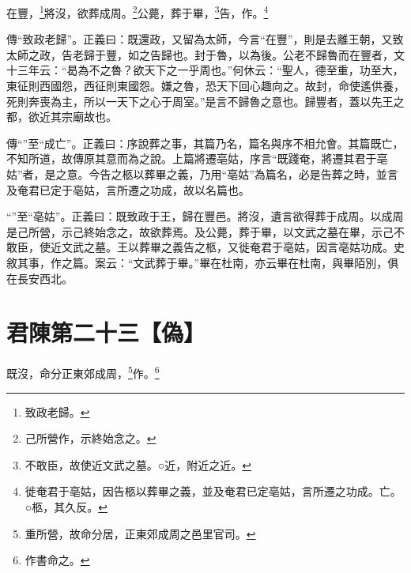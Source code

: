 在豐，\footnote{致政老歸。}將沒，欲葬成周。\footnote{己所營作，示終始念之。}公薨，葬于畢，\footnote{不敢臣，故使近文武之墓。○近，附近之近。}告，作。\footnote{徙奄君于亳姑，因告柩以葬畢之義，並及奄君已定亳姑，言所遷之功成。亡。○柩，其久反。}


{\noindent\zhuan{}\fzbyks 傳“致政老歸”。正義曰：既還政，又留為太師，今言“在豐”，則是去離王朝，又致太師之政，告老歸于豐，如之告歸也。封于魯，以為後。公老不歸魯而在豐者，文十三年云：“曷為不之魯？欲天下之一乎周也。”何休云：“聖人，德至重，功至大，東征則西國怨，西征則東國怨。嫌之魯，恐天下回心趣向之。故封，命使遙供養，死則奔喪為主，所以一天下之心于周室。”是言不歸魯之意也。歸豐者，蓋以先王之都，欲近其宗廟故也。 \par}

{\noindent\zhuan{}\fzbyks 傳“”至“成亡”。正義曰：序說葬之事，其篇乃名，篇名與序不相允會。其篇既亡，不知所道，故傳原其意而為之說。上篇將遷亳姑，序言“既踐奄，將遷其君于亳姑”者，是之意。今告之柩以葬畢之義，乃用“亳姑”為篇名，必是告葬之時，並言及奄君已定于亳姑，言所遷之功成，故以名篇也。 \par}

{\noindent\shu{}\fzkt “”至“亳姑”。正義曰：既致政于王，歸在豐邑。將沒，遺言欲得葬于成周。以成周是己所營，示己終始念之，故欲葬焉。及公薨，葬于畢，以文武之墓在畢，示己不敢臣，使近文武之墓。王以葬畢之義告之柩，又徙奄君于亳姑，因言亳姑功成。史敘其事，作之篇。案云：“文武葬于畢。”畢在杜南，亦云畢在杜南，與畢陌別，俱在長安西北。 \par}

\section{君陳第二十三【偽】}


既沒，命分正東郊成周，\footnote{重所營，故命分居，正東郊成周之邑里官司。}作。\footnote{作書命之。}


